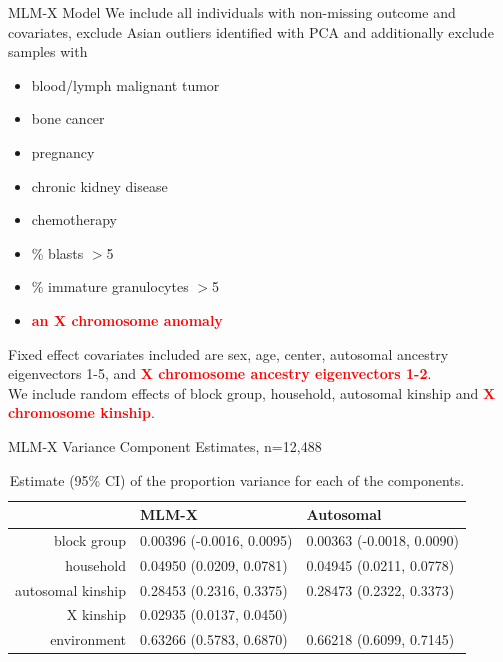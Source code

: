 \documentclass{beamer}
\begin{document}
\begin{frame}{MLM-X Model}
We include all individuals with non-missing outcome and covariates, exclude Asian outliers identified with PCA and additionally exclude samples with
\begin{itemize}
\item blood/lymph malignant tumor
\item bone cancer
\item pregnancy
\item chronic kidney disease
\item chemotherapy
\item \% blasts $>$5
\item \% immature granulocytes $>$5
\item \textbf{\textcolor{red}{an X chromosome anomaly}}
\end{itemize}
Fixed effect covariates included are sex, age, center, autosomal ancestry eigenvectors 1-5, and \textbf{\textcolor{red}{X chromosome ancestry eigenvectors 1-2}}.\\
We include random effects of block group, household, autosomal kinship and \textbf{\textcolor{red}{X chromosome kinship}}.
\end{frame}

\begin{frame}{MLM-X Variance Component Estimates, n=12,488}
\small
\begin{table}[h!]
\centering
\begin{tabular}{r|l||l}
  \hline
&MLM-X &Autosomal \\ \hline
block group & 0.00396 (-0.0016, 0.0095) & 0.00363 (-0.0018, 0.0090)\\
household &0.04950 (0.0209, 0.0781)& 0.04945  (0.0211, 0.0778)\\
autosomal kinship &0.28453 (0.2316, 0.3375) & 0.28473 (0.2322, 0.3373)\\
X kinship &0.02935 (0.0137, 0.0450) & \\
environment &0.63266 (0.5783, 0.6870) &  0.66218 (0.6099, 0.7145) \\ \hline
\end{tabular}
\caption{Estimate (95\% CI) of the proportion variance for each of the components.}
\label{table:varComp}
\end{table}
\end{frame}
\end{document}

